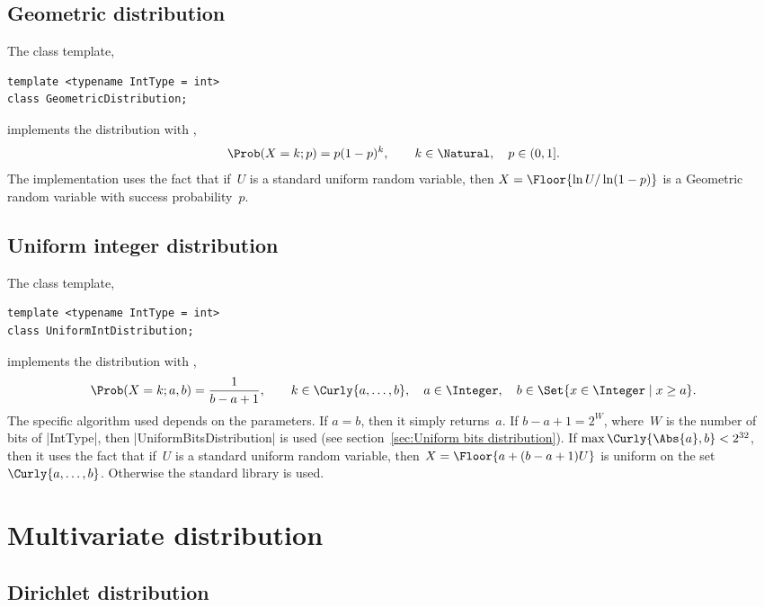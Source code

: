 \subsection{Geometric distribution}
\label{sub:Geometric distribution}

The class template,
\begin{verbatim}
template <typename IntType = int>
class GeometricDistribution;
\end{verbatim}
implements the distribution with \pdf,
\begin{equation*}
  \Prob(X = k;p) = p(1-p)^k,\qquad
  k \in \Natural,\quad p \in (0, 1].
\end{equation*}
The implementation uses the fact that if~$U$ is a standard uniform random
variable, then $X = \Floor{\ln U / \ln(1-p)}$ is a Geometric random variable
with success probability~$p$.

\subsection{Uniform integer distribution}
\label{sub:Uniform integer distribution}

The class template,
\begin{verbatim}
template <typename IntType = int>
class UniformIntDistribution;
\end{verbatim}
implements the distribution with \pdf,
\begin{equation*}
  \Prob(X = k;a,b) = \frac{1}{b - a + 1},\qquad
  k \in \Curly{a,\dots,b},\quad
  a \in \Integer,\quad b \in \Set{x \in \Integer \mid x \ge a}.
\end{equation*}
The specific algorithm used depends on the parameters. If $a = b$, then it
simply returns~$a$. If $b - a + 1 = 2^W$, where~$W$ is the number of bits of
|IntType|, then |UniformBitsDistribution| is used (see section~\ref{sec:Uniform
bits distribution}). If $\max\Curly{\Abs{a}, b} < 2^{32}$, then it uses the
fact that if~$U$ is a standard uniform random variable, then $X = \Floor{a + (b
  - a + 1) U}$ is uniform on the set $\Curly{a,\dots,b}$. Otherwise the
standard library is used.

\section{Multivariate distribution}
\label{sec:Multivariate distribution}

\subsection{Dirichlet distribution}
\label{sub:Dirichlet distribution}

